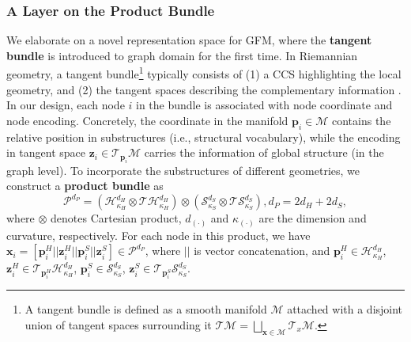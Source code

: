 



\vspace{-0.05in}
\subsubsection{\textbf{A Layer on the Product Bundle}}
We elaborate on a novel representation space for GFM, where the \textbf{tangent bundle} is introduced to graph domain for the first time.
In Riemannian geometry, a tangent bundle\footnote{A tangent bundle is defined as a smooth manifold $\mathcal M$ attached with a disjoint union of  tangent spaces surrounding it 
 $\mathcal T\mathcal M=\bigsqcup_{\boldsymbol x \in \mathcal M}\mathcal T_{x}\mathcal M$.} typically consists of  (1) a CCS highlighting the local geometry, and (2) the tangent spaces describing the complementary information \cite{Petersen16}. 
 In our design, each node $i$ in the bundle is associated with node coordinate and node encoding.
Concretely,
 the  coordinate  in the manifold $\boldsymbol p_i \in \mathcal M$ contains the relative position in substructures (i.e., structural vocabulary),
 while the  encoding in tangent space $\boldsymbol z_i \in\mathcal T_{\boldsymbol p_i}\mathcal M$ carries the information of global structure (in the graph level).
To incorporate the substructures of different geometries, we construct a \textbf{product bundle} as
    \vspace{-0.05in}
\begin{equation}
\mathcal P^{d_P}=\left(\mathcal H^{d_H}_{\kappa_H} \otimes \mathcal T\mathcal H^{d_H}_{\kappa_H}\right)\otimes \left(\mathcal S^{d_S}_{\kappa_S} \otimes \mathcal T\mathcal S^{d_S}_{\kappa_S}\right) ,  d_P=2d_H+2d_S,
\label{eq:space}
\end{equation}
where  $\otimes$ denotes Cartesian product, $d_{(\cdot)}$ and $\kappa_{(\cdot)}$ are the dimension and curvature, respectively.
For each node in this product, we have 
$\boldsymbol x_i =[\boldsymbol p^H_i||\boldsymbol z^H_i||\boldsymbol p^S_i||\boldsymbol z^S_i] \in \mathcal P^{d_P}$, 
where $||$ is vector concatenation, and 
$\boldsymbol p^H_i \in \mathcal H^{d_H}_{\kappa_H}$, $\boldsymbol z^H_i \in \mathcal T_{\boldsymbol p^H_i}\mathcal H^{d_H}_{\kappa_H}$, $\boldsymbol p^S_i \in \mathcal S^{d_S}_{\kappa_S}$, $\boldsymbol z^S_i \in \mathcal T_{\boldsymbol p^S_i}\mathcal S^{d_S}_{\kappa_S}$.
